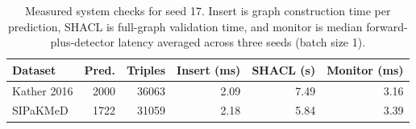 \begin{table}[t]
\centering
\caption{Measured system checks for seed 17. Insert is graph construction time per prediction, SHACL is full-graph validation time, and monitor is median forward-plus-detector latency averaged across three seeds (batch size 1).}
\label{tab:systems}
\small
\setlength{\tabcolsep}{4pt}
\begin{tabular}{lrrrrr}
\toprule
Dataset & Pred. & Triples & Insert (ms) & SHACL (s) & Monitor (ms) \\
\midrule
Kather 2016 & 2000 & 36063 & 2.09 & 7.49 & 3.16 \\
SIPaKMeD & 1722 & 31059 & 2.18 & 5.84 & 3.39 \\
\bottomrule
\end{tabular}
\end{table}
